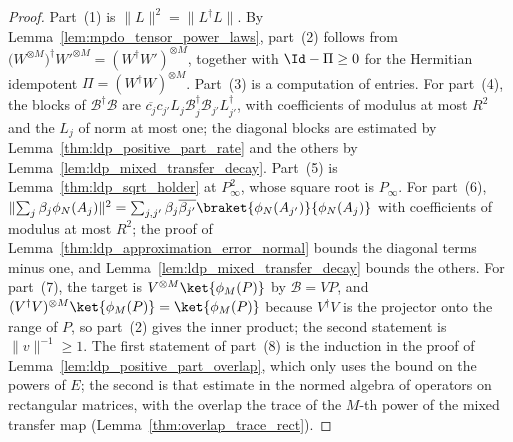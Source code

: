 \begin{proof}
    \leanok
    Part~(1) is $\lVert L\rVert^2=\lVert L^\dagger L\rVert$. By
    Lemma~\ref{lem:mpdo_tensor_power_laws}, part~(2) follows from
    $\bigl(W^{\otimes M}\bigr)^\dagger W'^{\otimes M}=(W^\dagger W')^{\otimes M}$,
    together with $\Id-\Pi\geq0$ for the Hermitian idempotent
    $\Pi=(W^\dagger W)^{\otimes M}$. Part~(3) is a computation of entries. For part~(4),
    the blocks of $\mathcal B^\dagger\mathcal B$ are
    $\overline{c_j}c_{j'}L_j\mathcal B_j^\dagger\mathcal B_{j'}L_{j'}^\dagger$, with
    coefficients of modulus at most $R^2$ and the $L_j$ of norm at most one; the diagonal
    blocks are estimated by Lemma~\ref{thm:ldp_positive_part_rate} and the others by
    Lemma~\ref{lem:ldp_mixed_transfer_decay}. Part~(5) is
    Lemma~\ref{thm:ldp_sqrt_holder} at $P_\infty^2$, whose square root is $P_\infty$.
    For part~(6),
    $\lVert\sum_j\beta_j\phi_N(A_j)\rVert^2
        =\sum_{j,j'}\beta_j\overline{\beta_{j'}}\braket{\phi_N(A_{j'})}{\phi_N(A_j)}$ with
    coefficients of modulus at most $R^2$; the proof of
    Lemma~\ref{thm:ldp_approximation_error_normal} bounds the diagonal terms minus one,
    and Lemma~\ref{lem:ldp_mixed_transfer_decay} bounds the others. For part~(7), the
    target is $V^{\otimes M}\ket{\phi_M(P)}$ by $\mathcal B=VP$, and
    $(V^\dagger V)^{\otimes M}\ket{\phi_M(P)}=\ket{\phi_M(P)}$ because $V^\dagger V$ is the
    projector onto the range of $P$, so part~(2) gives the inner product; the second
    statement is $\lVert v\rVert^{-1}\geq1$. The first statement of part~(8) is the
    induction in the proof of Lemma~\ref{lem:ldp_positive_part_overlap}, which only uses
    the bound on the powers of $E$; the second is that estimate in the normed algebra of
    operators on rectangular matrices, with the overlap the trace of the $M$-th power of
    the mixed transfer map (Lemma~\ref{thm:overlap_trace_rect}).
\end{proof}

